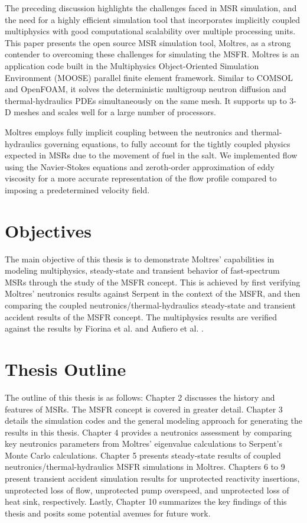 The preceding discussion highlights the challenges faced in MSR simulation,
and the need for a highly efficient simulation tool that incorporates
implicitly coupled multiphysics with good computational scalability over
multiple processing units. This paper presents the open source MSR simulation
tool, Moltres, as a strong contender to overcoming these challenges for
simulating the MSFR. Moltres is an application code
built in the Multiphysics Object-Oriented Simulation Environment (MOOSE)
parallel finite element framework. Similar to COMSOL and OpenFOAM, it solves
the deterministic multigroup neutron diffusion and thermal-hydraulics
\glspl{PDE} simultaneously on the same mesh. It supports up to 3-D meshes and
scales well for a large number of processors.

Moltres employs fully implicit coupling between the neutronics and
thermal-hydraulics governing equations, to fully account for the tightly
coupled physics expected in MSRs due to the movement of fuel in the salt. We
implemented flow using the Navier-Stokes equations and zeroth-order
approximation of eddy viscosity for a more accurate representation of the flow
profile compared to imposing a predetermined velocity field.

\section{Objectives}

The main objective of this thesis is to demonstrate Moltres' capabilities in
modeling multiphysics, steady-state and transient behavior of fast-spectrum
\glspl{MSR} through the study of the \gls{MSFR} concept. This is achieved by
first verifying Moltres' neutronics results against Serpent in the context of
the \gls{MSFR}, and then comparing the coupled neutronics/thermal-hydraulics
steady-state and transient accident results of the \gls{MSFR} concept. The
multiphysics results are verified against the results by Fiorina et al.
\cite{fiorina_modelling_2014} and Aufiero et al.
\cite{aufiero_development_2014}.

\section{Thesis Outline}

The outline of this thesis is as follows: Chapter 2 discusses the history and
features of \glspl{MSR}. The \gls{MSFR} concept is covered in greater detail.
Chapter 3 details the simulation codes and the general modeling approach for
generating the results in this thesis. Chapter 4 provides a neutronics
assessment by comparing key neutronics parameters from Moltres' eigenvalue
calculations to Serpent's Monte Carlo calculations. Chapter 5 presents
steady-state results of coupled neutronics/thermal-hydraulics \gls{MSFR}
simulations in Moltres. Chapters 6 to 9 present transient accident simulation
results for unprotected reactivity insertions, unprotected loss of flow,
unprotected pump overspeed, and unprotected loss of heat sink, respectively.
Lastly, Chapter 10 summarizes the key findings of this thesis and posits some
potential avenues for future work.
